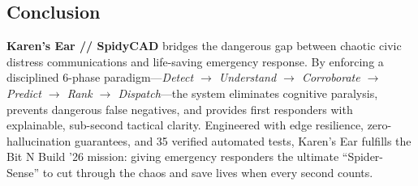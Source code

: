\documentclass[10pt,a4paper]{article}
\begin{document}
\subsection{Conclusion}
\textbf{Karen's Ear // SpidyCAD} bridges the dangerous gap between chaotic civic distress communications and life-saving emergency response. By enforcing a disciplined 6-phase paradigm---\emph{Detect $\rightarrow$ Understand $\rightarrow$ Corroborate $\rightarrow$ Predict $\rightarrow$ Rank $\rightarrow$ Dispatch}---the system eliminates cognitive paralysis, prevents dangerous false negatives, and provides first responders with explainable, sub-second tactical clarity. Engineered with edge resilience, zero-hallucination guarantees, and 35 verified automated tests, Karen's Ear fulfills the Bit N Build '26 mission: giving emergency responders the ultimate ``Spider-Sense'' to cut through the chaos and save lives when every second counts.
\end{document}
